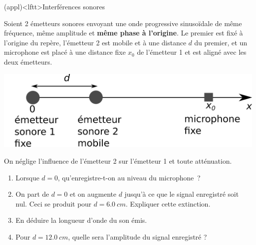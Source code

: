 \documentclass[../../main/main.tex]{subfiles}
\begin{document}
\begin{tcb*}[breakable](appl)<lftt>{Interférences sonores}
	\begin{minipage}{0.60\linewidth}
		Soient 2 émetteurs sonores envoyant une onde progressive sinusoïdale de même
		fréquence, même amplitude et \textbf{même phase à l'origine}.
		Le premier est fixé à l'origine du repère, l'émetteur 2 est mobile et à une
		distance $d$ du premier, et un microphone est placé à une distance fixe
		$x_0$ de l'émetteur 1 et est aligné avec les deux émetteurs.
	\end{minipage}
	\hfill
	\begin{minipage}{0.40\linewidth}
		\begin{center}
			\includegraphics[width=\linewidth]{microphone}
		\end{center}
	\end{minipage}
	\smallbreak
	On néglige l'influence de l'émetteur 2 sur l'émetteur 1 et toute atténuation.
	\begin{enumerate}[label=\sqenumi]
		\item Lorsque $d=0$, qu'enregistre-t-on au niveau du microphone~?
		\item On part de $d=0$ et on augmente $d$ jusqu'à ce que le signal
		      enregistré soit nul. Ceci se produit pour $d = \SI{6.0}{cm}$.
		      Expliquer cette extinction.
		\item En déduire la longueur d'onde du son émis.
		\item Pour $d = \SI{12.0}{cm}$, quelle sera l'amplitude du signal
		      enregistré ?
	\end{enumerate}
	\tcblower
\end{tcb*}
\end{document}
